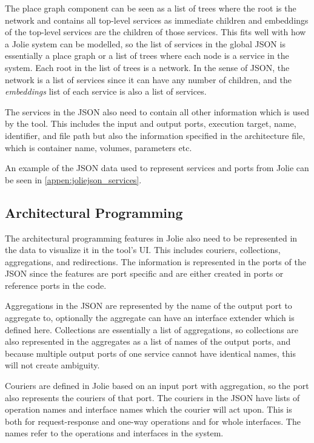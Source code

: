 The place graph component can be seen as a list of trees where the root is the network and contains all top-level services as immediate children and embeddings of the top-level services are the children of those services.
This fits well with how a Jolie system can be modelled, so the list of services in the global JSON is essentially a place graph or a list of trees where each node is a service in the system.
Each root in the list of trees is a network. In the sense of JSON, the network is a list of services since it can have any number of children, and the \textit{embeddings} list of each service is also a list of services.

The services in the JSON also need to contain all other information which is used by the tool.
This includes the input and output ports, execution target, name, identifier, and file path but also the information specified in the architecture file, which is container name, volumes, parameters etc.

An example of the JSON data used to represent services and ports from Jolie can be seen in \cref{appen:joliejson_services}.

\subsection{Architectural Programming}
The architectural programming features in Jolie also need to be represented in the data to visualize it in the tool's UI.
This includes couriers, collections, aggregations, and redirections. The information is represented in the ports of the JSON since the features are port specific and are either created in ports or reference ports in the code.

Aggregations in the JSON are represented by the name of the output port to aggregate to, optionally the aggregate can have an interface extender which is defined here.
Collections are essentially a list of aggregations, so collections are also represented in the aggregates as a list of names of the output ports, and because multiple output ports of one service cannot have identical names, this will not create ambiguity.

Couriers are defined in Jolie based on an input port with aggregation, so the port also represents the couriers of that port.
The couriers in the JSON have lists of operation names and interface names which the courier will act upon. This is both for request-response and one-way operations and for whole interfaces. The names refer to the operations and interfaces in the system.

